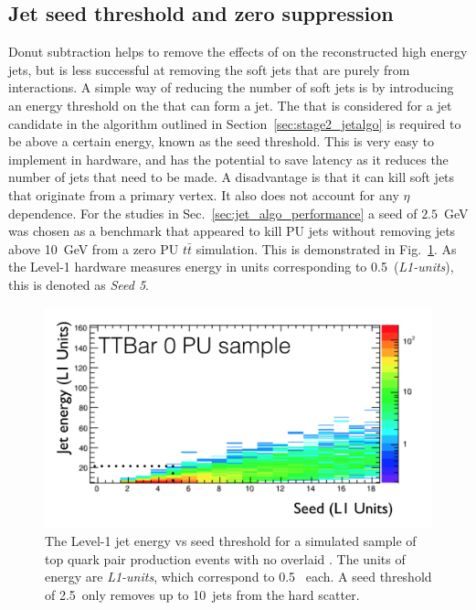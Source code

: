 \subsection{Jet seed threshold and zero suppression}

Donut subtraction helps to remove the effects of \PU on the
reconstructed high energy jets, but is less successful at removing the
soft jets that are purely from \PU interactions. A simple way of
reducing the number of soft jets is by introducing an energy threshold
on the \TT that can form a jet. The \TT that is considered for a jet
candidate in the algorithm outlined in
Section~\ref{sec:stage2_jetalgo} is required to be above a certain
energy, known as the seed threshold. This is very easy to implement in
hardware, and has the potential to save latency as it reduces the
number of jets that need to be made. A disadvantage is that it can
kill soft jets that originate from a primary vertex. It also does not
account for any $\eta$ dependence. For the studies in
Sec.~\ref{sec:jet_algo_performance} a seed of $2.5$~GeV was
chosen as a benchmark that appeared to kill PU jets without removing
jets above 10~GeV from a zero PU $t\bar{t}$ \MC simulation. This is
demonstrated in Fig.~\ref{fig:noPUSeedTTbar}. As the Level-1 hardware
measures energy in units corresponding to 0.5~\gev (\emph{L1-units}),
this is denoted as \emph{Seed 5}. 

\begin{figure}
	\begin{center}
		\includegraphics[width=0.8\linewidth]{figs/trigger/noPUSeedTTbar}
  \caption{The Level-1 jet energy vs seed threshold for a simulated
  sample of top quark pair production events with no overlaid \PU. The
  units of energy are \emph{L1-units}, which correspond to 0.5~\gev
  each. A seed threshold of 2.5~\gev only removes up to 10~\gev jets
  from the hard scatter.}
	\label{fig:noPUSeedTTbar}
	\end{center}
\end{figure}

